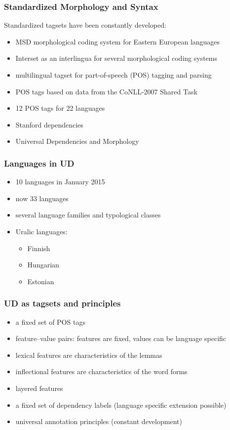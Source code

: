\documentclass{beamer}
\begin{document}
\begin{frame}
\frametitle{Standardized Morphology and Syntax}
Standardized tagsets have been constantly developed:
\begin{itemize}
\item MSD morphological coding system for Eastern European languages \cite{erjavec}
\item Interset as an interlingua for several morphological coding systems \cite{ZEMAN08.66}
\item multilingual tagset for part-of-speech (POS) tagging and parsing \cite{rambow:2006:LREC} \item POS tags based on data from the CoNLL-2007 Shared Task \cite{NivreT207} \cite{McDonaldCTE07}
\item 12 POS tags for 22 languages \cite{petrov-das-mcdonald:2012:LREC}
\item Stanford dependencies \cite{stanford:dep}
\item Universal Dependencies and Morphology
\end{itemize} 
\end{frame}

\begin{frame}
\frametitle{Languages in UD}
\begin{itemize}
\item 10 languages in January 2015
\item now 33 languages
\item several language families and typological classes
\item Uralic languages:
\begin{itemize}
\item Finnish
\item Hungarian
\item Estonian
\end{itemize}
\end{itemize}
\end{frame}

\begin{frame}
\frametitle{UD as tagsets and principles}
\begin{itemize}
\item a fixed set of POS tags
\item feature--value pairs: features are fixed, values can be language specific
\item lexical features are characteristics of the lemmas 
\item inflectional features are characteristics of the word forms
\item layered features
\item a fixed set of dependency labels (language specific extension possible)
\item universal annotation principles (constant development)
\end{itemize}
\end{frame}
\end{document}
